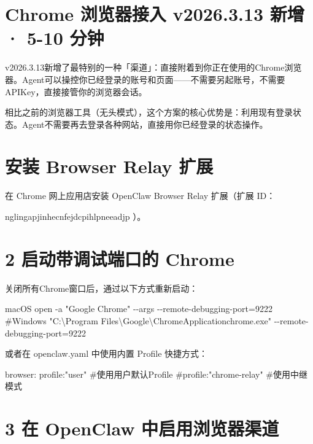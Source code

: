 \documentclass[
  10
]{article}
\newenvironment{Shaded}{}{}
\newcommand{\NormalTok}[1]{#1}
\begin{document}
\section{Chrome 浏览器接入 v2026.3.13 新增 · 5-10
分钟}\label{chrome-ux6d4fux89c8ux5668ux63a5ux5165-v2026.3.13-ux65b0ux589e-5-10-ux5206ux949f}

v2026.3.13新增了最特别的一种「渠道」：直接附着到你正在使用的Chrome浏览器。Agent可以操控你已经登录的账号和页面------不需要另起账号，不需要APIKey，直接接管你的浏览器会话。

相比之前的浏览器工具（无头模式），这个方案的核心优势是：利用现有登录状态。Agent不需要再去登录各种网站，直接用你已经登录的状态操作。

\section{安装 Browser Relay
扩展}\label{ux5b89ux88c5-browser-relay-ux6269ux5c55}

在 Chrome 网上应用店安装 OpenClaw Browser Relay 扩展（扩展 ID：

nglingapjinhecnfejdcpihlpneeadjp ）。

\section{2 启动带调试端口的
Chrome}\label{ux542fux52a8ux5e26ux8c03ux8bd5ux7aefux53e3ux7684-chrome}

关闭所有Chrome窗口后，通过以下方式重新启动：

\begin{Shaded}
\begin{Highlighting}[]
\NormalTok{macOS   }
\NormalTok{open {-}a "Google Chrome" {-}{-}args {-}{-}remote{-}debugging{-}port=9222   }
\NormalTok{\#Windows   }
\NormalTok{"C:\textbackslash{}Program Files\textbackslash{}Google\textbackslash{}ChromeApplicationchrome.exe" {-}{-}remote{-}debugging{-}port=9222}
\end{Highlighting}
\end{Shaded}

或者在 openclaw.yaml 中使用内置 Profile 快捷方式：

\begin{Shaded}
\begin{Highlighting}[]
\NormalTok{browser: profile:"user" \#使用用户默认Profile \#profile:"chrome{-}relay" \#使用中继模式}
\end{Highlighting}
\end{Shaded}

\section{3 在 OpenClaw
中启用浏览器渠道}\label{ux5728-openclaw-ux4e2dux542fux7528ux6d4fux89c8ux5668ux6e20ux9053}
\end{document}
